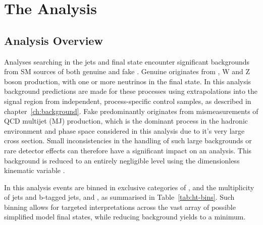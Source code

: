 \chapter{The \alphat Analysis}
\label{ch:analysis}

\ifpdf
    \graphicspath{{Chapter5/Figs/Raster/}{Chapter5/Figs/PDF/}{Chapter5/Figs/}}
\else
    \graphicspath{{Chapter5/Figs/Vector/}{Chapter5/Figs/}}
\fi


\section{Analysis Overview}  %
\label{sec:selection_analysis_overview}

Analyses searching in the jets and \met final state encounter significant 
backgrounds from SM sources of both genuine and fake \met. Genuine \met 
originates from \ttbar, W and Z boson production, with one or more
neutrinos in the final state. In this analysis background predictions are made
for these processes using 
extrapolations into the signal region from independent, process-specific control
samples, as described in chapter~\ref{ch:background}.
Fake \met predominantly originates from mismeasurements of QCD 
multijet (MJ) production, which is the dominant process in the hadronic
environment
and  phase space considered in this analysis due to it's very large cross
section.  Small inconsistencies in the handling of such large backgrounds or
rare detector effects can therefore 
have a significant impact on an analysis. This background is reduced to an 
entirely negligible level using the dimensionless kinematic variable \alphat.


In this analysis events are binned in exclusive categories of \HT, 
and the multiplicity of jets and b-tagged jets,  
\nj and \nb, as summarised in Table~\ref{tab:ht-bins}. Such binning allows for
targeted interpretations across the vast array of
possible simplified model final states, while reducing background yields to a 
minimum.

